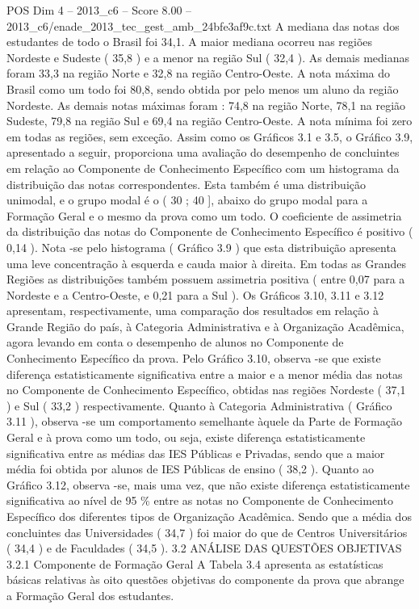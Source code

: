 \begin{textsample}{POS Dim 4 – 2013\_c6 – Score 8.00 – 2013\_c6/enade\_2013\_tec\_gest\_amb\_24bfe3af9c.txt}
A mediana das notas dos estudantes de todo o Brasil foi 34,1.
A maior mediana ocorreu nas regiões Nordeste e Sudeste ( 35,8 ) e a menor na região Sul ( 32,4 ).
As demais medianas foram 33,3 na região Norte e 32,8 na região Centro-Oeste.
A nota máxima do Brasil como um todo foi 80,8, sendo obtida por pelo menos um aluno da região Nordeste.
As demais notas máximas foram : 74,8 na região Norte, 78,1 na região Sudeste, 79,8 na região Sul e 69,4 na região Centro-Oeste.
A nota mínima foi zero em todas as regiões, sem exceção.
Assim como os Gráficos 3.1 e 3.5, o Gráfico 3.9, apresentado a seguir, proporciona uma avaliação do desempenho de concluintes em relação ao Componente de Conhecimento Específico com um histograma da distribuição das notas correspondentes.
Esta também é uma distribuição unimodal, e o grupo modal é o ( 30 ; 40 ], abaixo do grupo modal para a Formação Geral e o mesmo da prova como um todo.
O coeficiente de assimetria da distribuição das notas do Componente de Conhecimento Específico é positivo ( 0,14 ).
Nota -se pelo histograma ( Gráfico 3.9 ) que esta distribuição apresenta uma leve concentração à esquerda e cauda maior à direita.
Em todas as Grandes Regiões as distribuições também possuem assimetria positiva ( entre 0,07 para a Nordeste e a Centro-Oeste, e 0,21 para a Sul ).
Os Gráficos 3.10, 3.11 e 3.12 apresentam, respectivamente, uma comparação dos resultados em relação à Grande Região do país, à Categoria Administrativa e à Organização Acadêmica, agora levando em conta o desempenho de alunos no Componente de Conhecimento Específico da prova.
Pelo Gráfico 3.10, observa -se que existe diferença estatisticamente significativa entre a maior e a menor média das notas no Componente de Conhecimento Específico, obtidas nas regiões Nordeste ( 37,1 ) e Sul ( 33,2 ) respectivamente.
Quanto à Categoria Administrativa ( Gráfico 3.11 ), observa -se um comportamento semelhante àquele da Parte de Formação Geral e à prova como um todo, ou seja, existe diferença estatisticamente significativa entre as médias das IES Públicas e Privadas, sendo que a maior média foi obtida por alunos de IES Públicas de ensino ( 38,2 ).
Quanto ao Gráfico 3.12, observa -se, mais uma vez, que não existe diferença estatisticamente significativa ao nível de 95 \% entre as notas no Componente de Conhecimento Específico dos diferentes tipos de Organização Acadêmica.
Sendo que a média dos concluintes das Universidades ( 34,7 ) foi maior do que de Centros Universitários ( 34,4 ) e de Faculdades ( 34,5 ). 3.2 ANÁLISE DAS QUESTÕES OBJETIVAS 3.2.1 Componente de Formação Geral A Tabela 3.4 apresenta as estatísticas básicas relativas às oito questões objetivas do componente da prova que abrange a Formação Geral dos estudantes.

\end{textsample}
